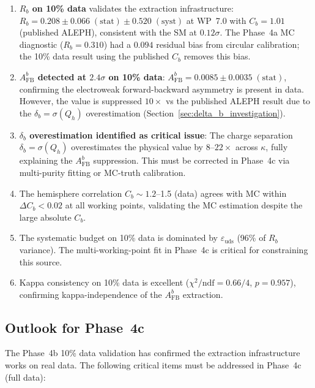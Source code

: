 \documentclass[11pt,a4paper]{article}
\begin{document}
\begin{enumerate}
\item \textbf{$R_b$ on 10\% data} validates the extraction infrastructure:
$R_b = 0.208 \pm 0.066\;\mathrm{(stat)} \pm 0.520\;\mathrm{(syst)}$ at WP~7.0
with $C_b = 1.01$ (published ALEPH), consistent with the SM at $0.12\sigma$.
The Phase~4a MC diagnostic ($R_b = 0.310$) had a $0.094$ residual bias from
circular calibration; the 10\% data result using the published $C_b$ removes
this bias.

\item \textbf{$A_\mathrm{FB}^b$ detected at $2.4\sigma$ on 10\% data}:
$A_\mathrm{FB}^b = 0.0085 \pm 0.0035\;\mathrm{(stat)}$, confirming the
electroweak forward-backward asymmetry is present in data. However, the
value is suppressed $10\times$ vs the published ALEPH result due to the
$\delta_b = \sigma(Q_h)$ overestimation (Section~\ref{sec:delta_b_investigation}).

\item \textbf{$\delta_b$ overestimation identified as critical issue}:
The charge separation $\delta_b = \sigma(Q_h)$ overestimates the physical value
by $8$--$22\times$ across $\kappa$, fully explaining the $A_\mathrm{FB}^b$ suppression.
This must be corrected in Phase~4c via multi-purity fitting or MC-truth calibration.

\item The hemisphere correlation $C_b \sim 1.2$--1.5 (data) agrees with MC within
$\Delta C_b < 0.02$ at all working points, validating the MC estimation despite
the large absolute $C_b$.

\item The systematic budget on 10\% data is dominated by $\varepsilon_\mathrm{uds}$
(96\% of $R_b$ variance). The multi-working-point fit in Phase~4c is critical for
constraining this source.

\item Kappa consistency on 10\% data is excellent ($\chi^2/\mathrm{ndf} = 0.66/4$,
$p = 0.957$), confirming kappa-independence of the $A_\mathrm{FB}^b$ extraction.
\end{enumerate}

\subsection{Outlook for Phase~4c}
\label{sec:outlook}

The Phase~4b 10\% data validation has confirmed the extraction infrastructure works
on real data. The following critical items must be addressed in Phase~4c (full data):
\end{document}
